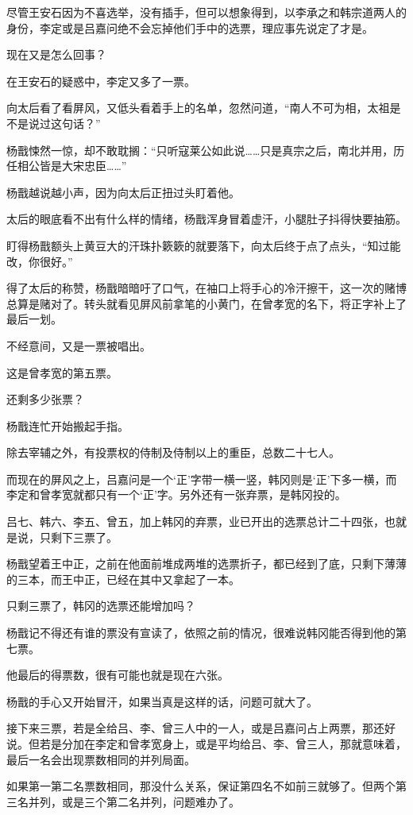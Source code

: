 尽管王安石因为不喜选举，没有插手，但可以想象得到，以李承之和韩宗道两人的身份，李定或是吕嘉问绝不会忘掉他们手中的选票，理应事先说定了才是。

现在又是怎么回事？

在王安石的疑惑中，李定又多了一票。

向太后看了看屏风，又低头看着手上的名单，忽然问道，“南人不可为相，太祖是不是说过这句话？”

杨戬悚然一惊，却不敢耽搁：“只听寇莱公如此说……只是真宗之后，南北并用，历任相公皆是大宋忠臣……”

杨戬越说越小声，因为向太后正扭过头盯着他。

太后的眼底看不出有什么样的情绪，杨戬浑身冒着虚汗，小腿肚子抖得快要抽筋。

盯得杨戬额头上黄豆大的汗珠扑簌簌的就要落下，向太后终于点了点头，“知过能改，你很好。”

得了太后的称赞，杨戬暗暗吁了口气，在袖口上将手心的冷汗擦干，这一次的赌博总算是赌对了。转头就看见屏风前拿笔的小黄门，在曾孝宽的名下，将正字补上了最后一划。

不经意间，又是一票被唱出。

这是曾孝宽的第五票。

还剩多少张票？

杨戬连忙开始搬起手指。

除去宰辅之外，有投票权的侍制及侍制以上的重臣，总数二十七人。

而现在的屏风之上，吕嘉问是一个‘正’字带一横一竖，韩冈则是‘正’下多一横，而李定和曾孝宽就都只有一个‘正’字。另外还有一张弃票，是韩冈投的。

吕七、韩六、李五、曾五，加上韩冈的弃票，业已开出的选票总计二十四张，也就是说，只剩下三票了。

杨戬望着王中正，之前在他面前堆成两堆的选票折子，都已经到了底，只剩下薄薄的三本，而王中正，已经在其中又拿起了一本。

只剩三票了，韩冈的选票还能增加吗？

杨戬记不得还有谁的票没有宣读了，依照之前的情况，很难说韩冈能否得到他的第七票。

他最后的得票数，很有可能也就是现在六张。

杨戬的手心又开始冒汗，如果当真是这样的话，问题可就大了。

接下来三票，若是全给吕、李、曾三人中的一人，或是吕嘉问占上两票，那还好说。但若是分加在李定和曾孝宽身上，或是平均给吕、李、曾三人，那就意味着，最后一名会出现票数相同的并列局面。

如果第一第二名票数相同，那没什么关系，保证第四名不如前三就够了。但两个第三名并列，或是三个第二名并列，问题难办了。

